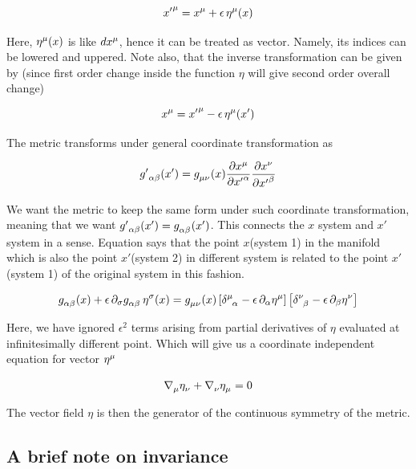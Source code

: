 \documentclass{report}
\begin{document}
$${x'}\indices{^\mu} = x\indices{^\mu} + \epsilon \, \eta\indices{^\mu}(x)$$

\noindent Here, $\eta\indices{^\mu}(x)$ is like $dx\indices{^\mu}$, hence it can be treated as vector. Namely, its indices can be lowered and uppered. Note also, that the inverse transformation can be given by (since first order change inside the function $\eta$ will give second order overall change)


$$x\indices{^\mu} = {x'}\indices{^\mu} - \epsilon \, \eta\indices{^\mu}(x')$$

\noindent The metric transforms under general coordinate transformation as 

$${g'}\indices{_\alpha_ \beta}(x') = g\indices{_\mu _\nu}(x)\frac{\partial x\indices{^\mu}}{\partial {x'}\indices{^\alpha}} \frac{\partial x\indices{^\nu}}{\partial {x'}\indices{^\beta}}$$

\noindent We want the metric to keep the same form under such coordinate transformation, meaning that we want ${g'}\indices{_\alpha_ \beta}(x') = g\indices{_\alpha_ \beta}(x')$. This connects the $x$ system and $x'$ system in a sense. Equation says that the point $x$(system 1) in the manifold which is also the point $x'$(system 2) in different system is related to the point $x'$(system 1) of the original system in this fashion. 

$$g\indices{_\alpha_ \beta}(x) + \epsilon \, \partial_\sigma g\indices{_\alpha_ \beta} \, \eta\indices{^\sigma}(x)= g\indices{_\mu_ \nu}(x) \left[\delta\indices{^\mu_\alpha} -\epsilon \, \partial_\alpha\eta\indices{^\mu}\right] \left[\delta\indices{^\nu_ \beta} -\epsilon \, \partial_ \beta\eta\indices{^\nu}\right]  $$

\noindent Here, we have ignored $\epsilon^2$ terms arising from partial derivatives of $\eta$ evaluated at infinitesimally different point. Which will give us a coordinate independent equation for vector $\eta\indices{^\mu}$

\begin{equation}
\nabla\indices{_\mu}\eta\indices{_\nu} + \nabla\indices{_\nu}\eta\indices{_\mu} = 0 
\end{equation}

\noindent The vector field $\eta$ is then the generator of the continuous symmetry of the metric.

\subsection{A brief note on invariance}
\end{document}
